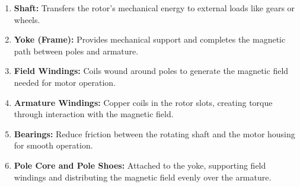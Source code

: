 \documentclass[a4paper,12pt]{article}
\begin{document}
\begin{enumerate}
		\item \textbf{Shaft:}  
		Transfers the rotor’s mechanical energy to external loads like gears or wheels.
		
		\item \textbf{Yoke (Frame):}  
		Provides mechanical support and completes the magnetic path between poles and armature.
		
		\item \textbf{Field Windings:}  
		Coils wound around poles to generate the magnetic field needed for motor operation.
		
		\item \textbf{Armature Windings:}  
		Copper coils in the rotor slots, creating torque through interaction with the magnetic field.
		
		\item \textbf{Bearings:}  
		Reduce friction between the rotating shaft and the motor housing for smooth operation.
		
		\item \textbf{Pole Core and Pole Shoes:}  
		Attached to the yoke, supporting field windings and distributing the magnetic field evenly over the armature.
		
	\end{enumerate}
	
\end{document}
